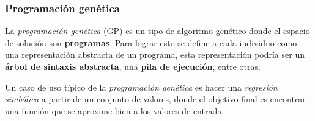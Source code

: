 \subsubsection{Programación genética}
  La \textit{programación genética} (GP)\autocite{langdonFoundationsGeneticProgramming2013} es un tipo de algoritmo 
  genético donde el espacio de solución son \textbf{programas}.
  Para lograr esto se define a cada individuo como una representación abstracta de un programa, esta
  representación podría ser un \textbf{árbol de sintaxis abstracta}, una \textbf{pila de ejecución},
  entre otras.

  Un caso de uso típico de la \textit{programación genética} es hacer una \textit{regresión 
  simbólica}\autocite{poliFieldGuideGenetic2008} a partir de un conjunto de valores, donde el objetivo final es 
  encontrar una función que se aproxime bien a los valores de entrada.
  
